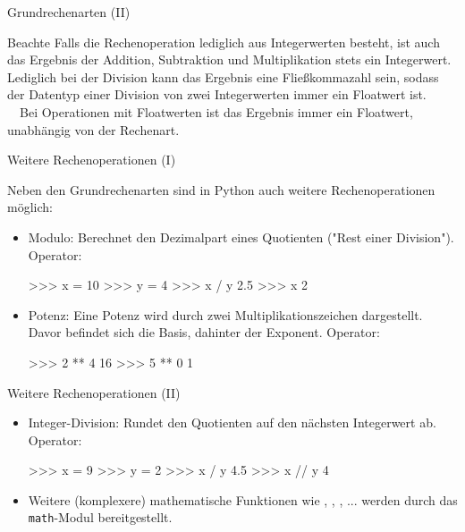         
        \begin{frame}[fragile]{Grundrechenarten (II)}
            
            \begin{block}{Beachte}
                Falls die Rechenoperation lediglich aus Integerwerten besteht, ist auch das Ergebnis der Addition, Subtraktion und Multiplikation stets ein Integerwert. Lediglich bei der Division kann das Ergebnis eine Fließkommazahl sein, sodass der Datentyp einer Division von zwei Integerwerten immer ein Floatwert ist. \\~\
                Bei Operationen mit Floatwerten ist das Ergebnis immer ein Floatwert, unabhängig von der Rechenart.
            \end{block}
        \end{frame}
        
         \begin{frame}[fragile]{Weitere Rechenoperationen (I)}
            
            Neben den Grundrechenarten sind in Python auch weitere Rechenoperationen möglich:
            
              \begin{itemize}
                \item Modulo: Berechnet den Dezimalpart eines Quotienten ("Rest einer Division"). Operator: \code{\%}
                 
\begin{pyconcode}
>>> x = 10
>>> y = 4
>>> x / y
2.5
>>> x %
2
\end{pyconcode}                   
                
                \item Potenz: Eine Potenz wird durch zwei Multiplikationszeichen dargestellt. Davor befindet sich die Basis, dahinter der Exponent. Operator: \code{**}

\begin{pyconcode}
>>> 2 ** 4
16
>>> 5 ** 0
1
\end{pyconcode}                   
                
            \end{itemize}
        \end{frame}

        \begin{frame}[fragile]{Weitere Rechenoperationen (II)}
             \begin{itemize}
                \item Integer-Division: Rundet den Quotienten auf den nächsten Integerwert ab. Operator: \code{//}
                 
\begin{pyconcode}
>>> x = 9
>>> y = 2
>>> x / y
4.5
>>> x // y
4
\end{pyconcode}     
                \item Weitere (komplexere) mathematische Funktionen wie , , , ... werden durch das \texttt{math}-Modul bereitgestellt.
            \end{itemize}
        \end{frame}
        
